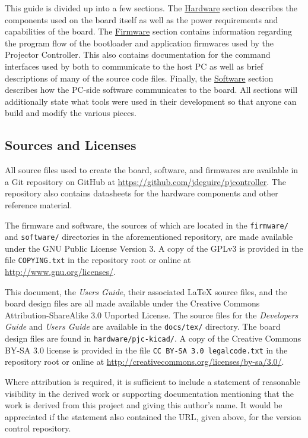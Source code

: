 \documentclass{article}
\begin{document}
This guide is divided up into a few sections.  The \hyperref[Hardware_sec]{Hardware} section
describes the components used on the board itself as well as the power requirements and capabilities
of the board.  The \hyperref[Firmware_sec]{Firmware} section contains information regarding the
program flow of the bootloader and application firmwares used by the Projector Controller.  This
also contains documentation for the command interfaces used by both to communicate to the host PC as
well as brief descriptions of many of the source code files.  Finally, the
\hyperref[Software_sec]{Software} section describes how the PC-side software communicates to the
board.  All sections will additionally state what tools were used in their development so that
anyone can build and modify the various pieces.

\subsection{Sources and Licenses} \label{SourceLic_sec}
All source files used to create the board, software, and firmwares are available in a Git repository
on GitHub at \url{https://github.com/jdeguire/pjcontroller}.  The repository also contains
datasheets for the hardware components and other reference material.

The firmware and software, the sources of which are located in the \texttt{firmware/} and
\texttt{software/} directories in the aforementioned repository, are made available under the GNU
Public License Version 3.  A copy of the GPLv3 is provided in the file \texttt{COPYING.txt} in the
repository root or online at \url{http://www.gnu.org/licenses/}.

This document, the \textit{Users Guide}, their associated \LaTeX{} source files, and the board
design files are all made available under the Creative Commons Attribution-ShareAlike 3.0 Unported
License.  The source files for the \textit{Developers Guide} and \textit{Users Guide} are available
in the \texttt{docs/tex/} directory.  The board design files are found in
\texttt{hardware/pjc-kicad/}.  A copy of the Creative Commons BY-SA 3.0 license is provided in the
file \texttt{CC BY-SA 3.0 legalcode.txt} in the repository root or online at
\url{http://creativecommons.org/licenses/by-sa/3.0/}.

Where attribution is required, it is sufficient to include a statement of reasonable visibility in
the derived work or supporting documentation mentioning that the work is derived from this project
and giving this author's name.  It would be appreciated if the statement also contained the URL,
given above, for the version control repository.
\end{document}

